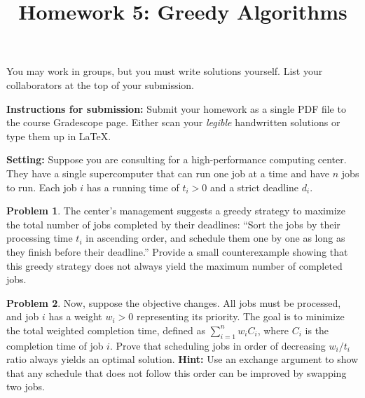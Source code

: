 \documentclass[10pt]{article}
\title{Homework 5: Greedy Algorithms}
\date{}
\theoremstyle{definition}
\newtheorem{problem}{Problem}
\newenvironment{solution}{\begin{proof}[Solution]}{\end{proof}}
\begin{document}
\maketitle
\thispagestyle{fancy}

\noindent You may work in groups, but you must write solutions yourself. List your collaborators at the top of your submission. 

\vspace{1em}

\noindent \textbf{Instructions for submission:} Submit your homework as a single PDF file to the course Gradescope page. Either scan your \emph{legible} handwritten solutions or type them up in \LaTeX. 

\vspace{5pt}
\noindent \textbf{Setting:} Suppose you are consulting for a high-performance computing center. They have a single supercomputer that can run one job at a time and have $n$ jobs to run. Each job $i$ has a running time of $t_i > 0$ and a strict deadline $d_i$.  

\begin{problem}
    The center's management suggests a greedy strategy to maximize the total number of jobs completed by their deadlines: ``Sort the jobs by their processing time $t_i$ in ascending order, and schedule them one by one as long as they finish before their deadline.'' Provide a small counterexample showing that this greedy strategy does not always yield the maximum number of completed jobs.
\end{problem}


\begin{problem}
    Now, suppose the objective changes. All jobs must be processed, and job $i$ has a weight $w_i > 0$ representing its priority. The goal is to minimize the total weighted completion time, defined as $\sum_{i=1}^n w_i C_i$, where $C_i$ is the completion time of job $i$. Prove that scheduling jobs in order of decreasing $w_i / t_i$ ratio always yields an optimal solution. \textbf{Hint:} Use an exchange argument to show that any schedule that does not follow this order can be improved by swapping two jobs.
\end{problem}

\end{document}
